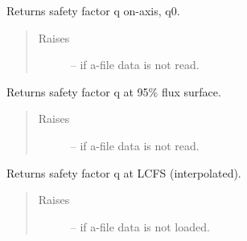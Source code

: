 \documentclass[letterpaper,10pt,english]{sphinxmanual}
\begin{document}
\begin{fulllineitems}

\begin{fulllineitems}
\label{eqtools:eqtools.eqdskreader.EqdskReader.getQ0}
Returns safety factor q on-axis, q0.
\begin{quote}\begin{description}
\item[{Raises }] \leavevmode
{} -- 
if a-file data is not read.

\end{description}\end{quote}

\end{fulllineitems}


\begin{fulllineitems}
\label{eqtools:eqtools.eqdskreader.EqdskReader.getQ95}
Returns safety factor q at 95\% flux surface.
\begin{quote}\begin{description}
\item[{Raises }] \leavevmode
{} -- 
if a-file data is not read.

\end{description}\end{quote}

\end{fulllineitems}


\begin{fulllineitems}
\label{eqtools:eqtools.eqdskreader.EqdskReader.getQLCFS}
Returns safety factor q at LCFS (interpolated).
\begin{quote}\begin{description}
\item[{Raises }] \leavevmode
{} -- 
if a-file data is not loaded.

\end{description}\end{quote}

\end{fulllineitems}



\end{fulllineitems}
\end{document}
